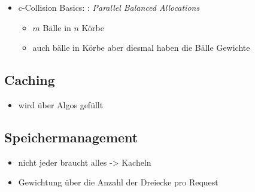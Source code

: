\begin{itemize}
\begin{itemize}
  \end{itemize}
  \item c-Collision Basics: \cite{ccol3}: \textit{Parallel Balanced Allocations}
  \begin{itemize}
    \item $m$ Bälle in $n$ Körbe
  \end{itemize}
  \begin{itemize}
    \item auch bälle in Körbe aber diesmal haben die Bälle Gewichte
  \end{itemize}

\end{itemize}

\subsection{Caching}
\label{sec:basics:caching}
\begin{itemize}
 \item wird über Algos gefüllt
\end{itemize}

\subsection{Speichermanagement}
\label{sec:basics:speichermanagement}
\begin{itemize}
 \item nicht jeder braucht alles -> Kacheln
 \item Gewichtung über die Anzahl der Dreiecke pro Request
\end{itemize}
